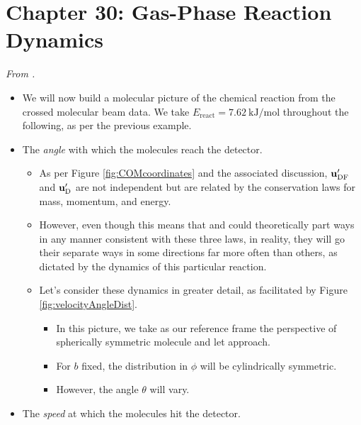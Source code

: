 \documentclass[../notes.tex]{subfiles}
\begin{document}
\section{Chapter 30: Gas-Phase Reaction Dynamics}
\emph{From \textcite{bib:McQuarrieSimon}.}
\begin{itemize}
    \item {}We will now build a molecular picture of the  chemical reaction from the crossed molecular beam data. We take $E_\text{react}=\SI{7.62}{\kilo\joule\per\mole}$ throughout the following, as per the previous example.
    \item The \emph{angle} with which the molecules reach the detector.
    \begin{itemize}
        \item As per Figure \ref{fig:COMcoordinates} and the associated discussion, $\mathbf{u}_{\ce{DF}}'$ and $\mathbf{u}_{\ce{D}}'$ are not independent but are related by the conservation laws for mass, momentum, and energy.
        \item However, even though this means that  and  could theoretically part ways in any manner consistent with these three laws, in reality, they will go their separate ways in some directions far more often than others, as dictated by the dynamics of this particular reaction.
        \item Let's consider these dynamics in greater detail, as facilitated by Figure \ref{fig:velocityAngleDist}.
        \begin{itemize}
            \item In this picture, we take as our reference frame the perspective of spherically symmetric molecule  and let  approach.
            \item For $b$ fixed, the distribution in $\phi$ will be cylindrically symmetric.
            \item {}However, the angle $\theta$ will vary.
        \end{itemize}
    \end{itemize}
    \item The \emph{speed} at which the molecules hit the detector.
    \begin{figure}[h!]
        \centering
\end{figure}
\end{itemize}
\end{document}
